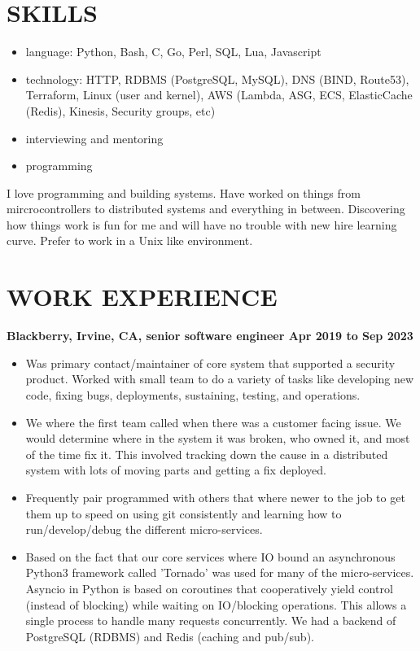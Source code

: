\documentclass{res}
\begin{document}
\address{john@jjdev.com - (714) 895 6311 - Westminster, CA 92683}

\begin{resume}
  \section{SKILLS}
  \begin{itemize}
  \item
    language: Python, Bash, C, Go, Perl, SQL, Lua, Javascript
  \item
      technology: HTTP, RDBMS (PostgreSQL, MySQL), DNS (BIND, Route53), Terraform, Linux (user and kernel), AWS (Lambda, ASG, ECS, ElasticCache (Redis), Kinesis, Security groups, etc)
  \item
      interviewing and mentoring
  \item
      programming
  \end{itemize}

I love programming and building systems. Have worked on things
from mircrocontrollers to distributed systems and everything in
between. Discovering how things work is fun for me and will have no
trouble with new hire learning curve. Prefer to work in a Unix like
environment.

  \section{WORK EXPERIENCE}
  {\large \bf Blackberry, Irvine, CA, senior software engineer \hfill Apr 2019 to Sep 2023}
  \begin{itemize}
  \item
    Was primary contact/maintainer of core system that supported a
    security product.  Worked with small team to do a variety of tasks
    like developing new code, fixing bugs, deployments, sustaining,
    testing, and operations.
  \item
    We where the first team called when there was a customer facing
    issue. We would determine where in the system it was broken, who
    owned it, and most of the time fix it.  This involved tracking down
    the cause in a distributed system with lots of moving parts and
    getting a fix deployed.
  \item
    Frequently pair programmed with others that where newer to the job
    to get them up to speed on using git consistently and learning how
    to run/develop/debug the different micro-services.
  \item
Based on the fact that our core services where IO bound
an asynchronous Python3 framework called 'Tornado' was used for many
of the micro-services. Asyncio in Python is based on coroutines that
cooperatively yield control (instead of blocking) while waiting on
IO/blocking operations. This allows a single process to handle many
requests concurrently.  We had a backend of PostgreSQL (RDBMS) and Redis
(caching and pub/sub).


\end{itemize}
\end{resume}
\end{document}
